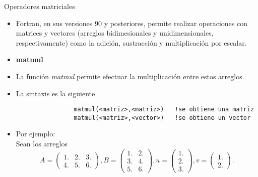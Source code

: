 \begin{frame}[fragile]{Operadores matriciales} 
    \begin{itemize}[<+(0)->]
        \item Fortran, en sus versiones 90 y posteriores, permite realizar operaciones con matrices y vectores (arreglos bidimesionales y unidimensionales, respectivamente) como la adición, sustracción y multiplicación por escalar.
        \item [] \textbf{matmul}
        \item La función \emph{matmul} permite efectuar la multiplicación entre estos arreglos.
        \item La sintaxis es la siguiente \\
        \vspace{0.1cm}
            \begin{verbatim}
                matmul(<matriz>,<matriz>)   !se obtiene una matriz
                matmul(<matriz>,<vector>)   !se obtiene un vector
            \end{verbatim}
        \item [] Por ejemplo: \\
        Sean los arreglos
            \begin{equation*}
            A = \begin{pmatrix}
                    1. & 2. & 3.\\
                    4. & 5. & 6.
                \end{pmatrix},  
            B = \begin{pmatrix}
                    1. & 2.\\
                    3. & 4.\\
                    5. & 6.
                \end{pmatrix},  
            u = \begin{pmatrix}
                    1.\\
                    2.\\
                    3.
                \end{pmatrix},  
            v = \begin{pmatrix}
                    1.\\
                    2.  
                \end{pmatrix}.
            \end{equation*} 
    \end{itemize}
\end{frame}


